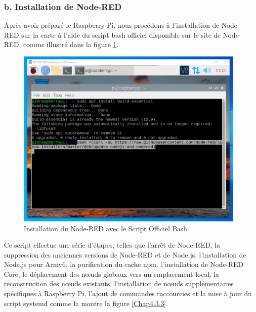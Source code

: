 \subsubsection{b. Installation de Node-RED}

Après avoir préparé le Raspberry Pi, nous procédons à l'installation de Node-RED sur la carte à l'aide du script bash officiel disponible sur le site de Node-RED, comme illustré dans la figure \ref{Chap4.3.2}.

\begin{figure}[H]
 \centering
    \includegraphics[width=15cm]{Images/NodeRedInstall1.png}
    \caption{Installation du Node-RED avec le Script Officiel Bash}
    \label{Chap4.3.2}
\end{figure}    

Ce script effectue une série d'étapes, telles que l'arrêt de Node-RED, la suppression des anciennes versions de Node-RED et de Node.js, l'installation de Node.js pour Armv6, la purification du cache npm, l'installation de Node-RED Core, le déplacement des nœuds globaux vers un emplacement local, la reconstruction des nœuds existants, l'installation de nœuds supplémentaires spécifiques à Raspberry Pi, l'ajout de commandes raccourcies et la mise à jour du script systemd comme la montre la figure \ref{Chap4.3.3}.

